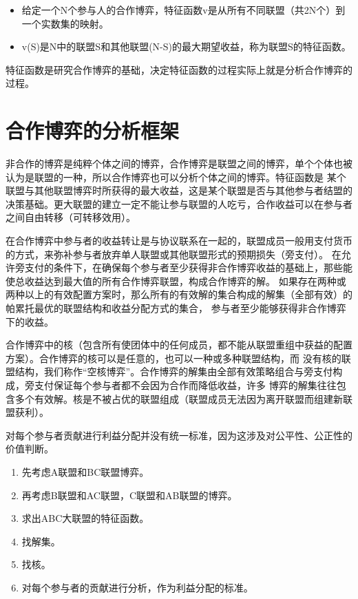 \documentclass[12pt, a4paper]{article} %
\begin{document}
\begin{CJK*}{UTF8}{gbsn}
        \begin{itemize}
            \item[] 给定一个N个参与人的合作博弈，特征函数v是从所有不同联盟（共2N个）到一个实数集的映射。
            \item[] v(S)是N中的联盟S和其他联盟(N-S)的最大期望收益，称为联盟S的特征函数。
        \end{itemize}

        特征函数是研究合作博弈的基础，决定特征函数的过程实际上就是分析合作博弈的过程。

        \clearpage
        \section{合作博弈的分析框架}
        非合作的博弈是纯粹个体之间的博弈，合作博弈是联盟之间的博弈，单个个体也被认为是联盟的一种，所以合作博弈也可以分析个体之间的博弈。特征函数是
        某个联盟与其他联盟博弈时所获得的最大收益，这是某个联盟是否与其他参与者结盟的决策基础。更大联盟的建立一定不能让参与联盟的人吃亏，合作收益可以在参与者之间自由转移（可转移效用）。\par

        在合作博弈中参与者的收益转让是与协议联系在一起的，联盟成员一般用支付货币的方式，来弥补参与者放弃单人联盟或其他联盟形式的预期损失（旁支付）。
        在允许旁支付的条件下，在确保每个参与者至少获得非合作博弈收益的基础上，那些能使总收益达到最大值的所有合作博弈联盟，构成合作博弈的解。
        如果存在两种或两种以上的有效配置方案时，那么所有的有效解的集合构成的解集（全部有效）的帕累托最优的联盟结构和收益分配方式的集合，
        参与者至少能够获得非合作博弈下的收益。\par

        合作博弈中的核（包含所有使团体中的任何成员，都不能从联盟重组中获益的配置方案）。合作博弈的核可以是任意的，也可以一种或多种联盟结构，而
        没有核的联盟结构，我们称作“空核博弈”。合作博弈的解集由全部有效策略组合与旁支付构成，旁支付保证每个参与者都不会因为合作而降低收益，许多
        博弈的解集往往包含多个有效解。核是不被占优的联盟组成（联盟成员无法因为离开联盟而组建新联盟获利）。\par

        对每个参与者贡献进行利益分配并没有统一标准，因为这涉及对公平性、公正性的价值判断。

        \begin{enumerate}
            \item 先考虑A联盟和BC联盟博弈。
            \item 再考虑B联盟和AC联盟，C联盟和AB联盟的博弈。
            \item 求出ABC大联盟的特征函数。
            \item 找解集。
            \item 找核。
            \item 对每个参与者的贡献进行分析，作为利益分配的标准。
        \end{enumerate}


\end{CJK*}
\end{document}
